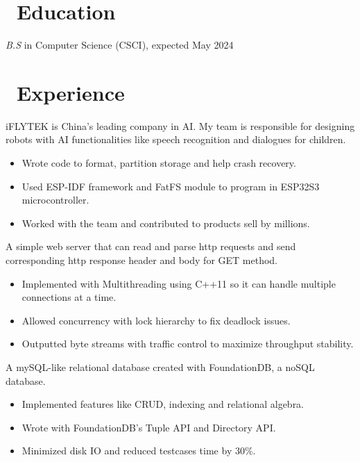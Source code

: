 \documentclass{resume}
\begin{document}



\section{\faGraduationCap\ Education}
\textit{B.S} in Computer Science (CSCI), expected May 2024

\section{\faUsers\ Experience}
  iFLYTEK is China's leading company in AI. My team is responsible for designing robots with AI functionalities like speech recognition and dialogues for children.
\begin{itemize}
  \item Wrote code to format, partition storage and help crash recovery.
  \item Used ESP-IDF framework and FatFS module to program in ESP32S3 microcontroller.
  \item Worked with the team and contributed to products sell by millions.
\end{itemize}

  A simple web server that can read and parse http requests and send corresponding http response header and body for GET method.
\begin{itemize}
  \item Implemented with Multithreading using C++11 so it can handle multiple connections at a time.
  \item Allowed concurrency with lock hierarchy to fix deadlock issues.
  \item Outputted byte streams with traffic control to maximize throughput stability.
\end{itemize}

  A mySQL-like relational database created with FoundationDB, a noSQL database.
\begin{itemize}
  \item Implemented features like CRUD, indexing and relational algebra.
  \item Wrote with FoundationDB's Tuple API and Directory API.
  \item Minimized disk IO and reduced testcases time by 30\%.
\end{itemize}
\end{document}
